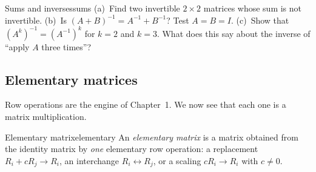 \documentclass[11pt]{article}
\begin{document}
\begin{think}{Sums and inverses}{sums}
(a)~Find two invertible $2\times2$ matrices whose sum is not invertible. (b)~Is $(A+B)^{-1}=A^{-1}+B^{-1}$? Test $A=B=I$. (c)~Show that $(A^k)^{-1}=(A^{-1})^k$ for $k=2$ and $k=3$. What does this say about the inverse of ``apply $A$ three times''?
\end{think}

\subsection*{Elementary matrices}

Row operations are the engine of Chapter~1. We now see that each one is a matrix multiplication.

\begin{defn}{Elementary matrix}{elementary}
An \emph{elementary matrix} is a matrix obtained from the identity matrix by \emph{one} elementary row operation: a replacement $R_i+cR_j\to R_i$, an interchange $R_i\leftrightarrow R_j$, or a scaling $cR_i\to R_i$ with $c\neq0$.
\end{defn}
\end{document}
